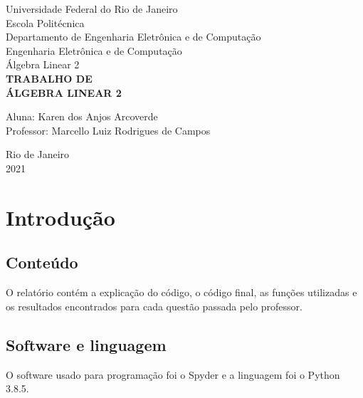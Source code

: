\documentclass[a4paper,12pt,twoside]{article}
\date{}
\begin{document}
\begin{titlepage} %
\begin{center} %
{\large Universidade Federal do Rio de Janeiro}\\[0.2cm] %
{\large Escola Politécnica}\\[0.2cm] %
{\large Departamento de Engenharia Eletrônica e de Computação}\\[0.2cm]
{\large Engenharia Eletrônica e de Computação}\\[0.2cm]
{\large Álgebra Linear 2}\\[5.1cm]
{\bf \huge TRABALHO DE}\\ %
{\bf \huge ÁLGEBRA LINEAR 2}\\[5.1cm] 
\end{center} %
{\large Aluna: Karen dos Anjos Arcoverde}\\[0.7cm] %
{\large Professor: Marcello Luiz Rodrigues de Campos}\\[5.1cm]
\begin{center}
{\large Rio de Janeiro}\\[0.2cm]
{\large 2021}
\end{center}
\end{titlepage} %


\renewcommand{\contentsname}{Sumário}

\tableofcontents
\clearpage





\section{Introdução}
\subsection{Conteúdo}
    O relatório contém a explicação do código, o código final, as funções utilizadas e os resultados encontrados para cada questão passada pelo professor.
\subsection{Software e linguagem}
    O software usado para programação foi o Spyder e a linguagem foi o Python 3.8.5.
\end{document}
